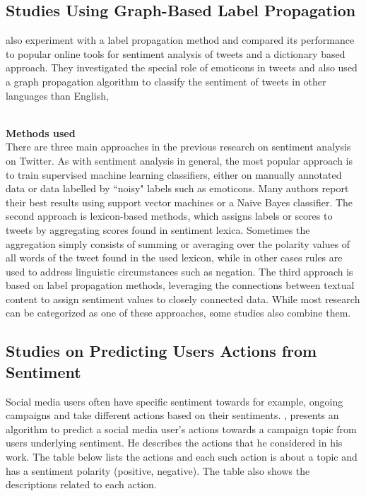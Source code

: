 \subsection{Studies Using Graph-Based Label Propagation}
\cite{ref36} also experiment with a label propagation method and compared its performance
to popular online tools for sentiment analysis of tweets and a dictionary based approach. They
investigated the special role of emoticons in tweets and also used a graph propagation algorithm
to classify the sentiment of tweets in other languages than English, \cite{ref37}



\leavevmode\\
\textbf{Methods used}\\
There are three main approaches in the previous research on sentiment analysis on Twitter. As
with sentiment analysis in general, the most popular approach is to train supervised machine
learning classifiers, either on manually annotated data or data labelled by “noisy" labels such as
emoticons. Many authors report their best results using support vector machines or a Naive Bayes
classifier. The second approach is lexicon-based methods, which assigns labels or scores to tweets
by aggregating scores found in sentiment lexica. Sometimes the aggregation simply consists of
summing or averaging over the polarity values of all words of the tweet found in the used lexicon,
while in other cases rules are used to address linguistic circumstances such as negation. The third
approach is based on label propagation methods, leveraging the connections between textual
content to assign sentiment values to closely connected data. While most research can be
categorized as one of these approaches, some studies also combine them.

\subsection{Studies on Predicting Users Actions from Sentiment}
Social media users often have specific sentiment towards for example, ongoing campaigns and
take different actions based on their sentiments. \cite{ref38}, presents an algorithm to predict
a social media user's actions towards a campaign topic from user\textquotesingle s underlying sentiment. He describes the actions that he considered in his work. The table below lists the actions and each such
action is about a topic and has a sentiment polarity (positive, negative). The table also shows the
descriptions related to each action.


